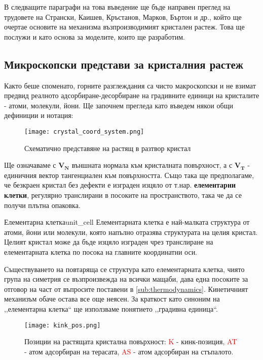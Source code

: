 В следващите параграфи на това въведение ще бъде направен преглед на трудовете на Странски, Каишев, Кръстанов, Марков, Бъртон и др., който ще очертае основите на механизма възпроизводимият кристален растеж. Това ще послужи и като основа за моделите, които ще разработим.

\subsection{Микроскопски представи за кристалния растеж}
\label{sub:microscopic_growth}
Както беше споменато, горните разглеждания са чисто макроскопски и не взимат предвид реалното адсорбиране-десорбиране на градивните единици на кристалите - атоми, молекули, йони. Ще започнем прегледа като въведем някои общи дефиниции и нотация:
\begin{figure}[htbp]
	\centering
	\texttt{[image: crystal\_coord\_system.png]}
	\caption{Схематично представяне на растящ в разтвор кристал}
\end{figure}

\noindent Ще означаваме с $\boldsymbol{V_{N}}$ външната нормала към кристалната повърхност, а с $\boldsymbol{V_{T}}$ - единичния вектор тангенциален към повърхността. Също така ще предполагаме, че безкраен кристал без дефекти е изграден изцяло от т.нар. \textbf{елементарни клетки}, регулярно транслирани в посоките на пространството, така че да се получи плътна опаковка.

\begin{definition}{Елементарна клетка}{unit_cell}
    Елементарната клетка е най-малката структура от атоми, йони или молекули, която напълно отразява структурата на целия кристал. Целият кристал може да бъде изцяло изграден чрез транслиране на елементарната клетка по посока на главните координатни оси.
\end{definition}

Съществуването на повтаряща се структура като елементарната клетка, чиято група на симетрия се възпроизвежда на всички мащаби, дава една посоките за отговор на част от въпросите поставени в \autoref{sub:thermodynamics}. Кинетичният механизъм обаче остава все още неясен. За краткост като синоним на ,,елементарна клетка`` ще използваме понятието ,,градивна единица``.

\begin{figure}[ht]
	\centering
	\texttt{[image: kink\_pos.png]}
	\caption{Позиции на растящата кристална повърхност:  \textcolor{red}{K} - кинк-позиция, \textcolor{red}{AT} - атом адсорбиран на терасата, \textcolor{red}{AS} - атом адсорбиран на стъпалото. }
	\label{fig:atoms_on_surface}
\end{figure}

